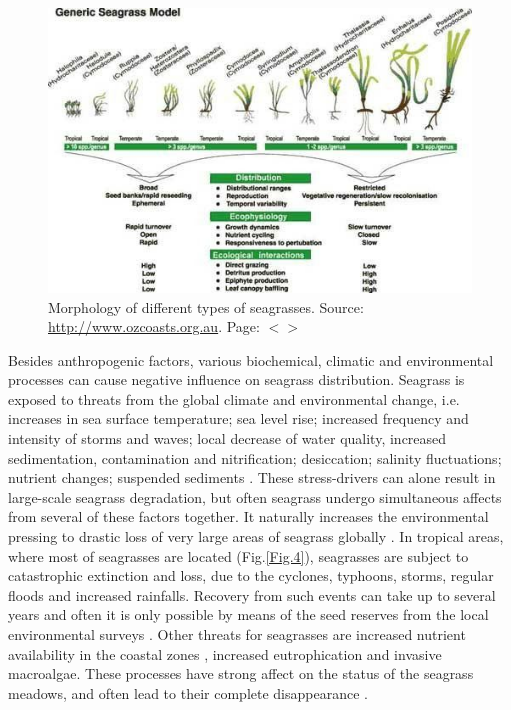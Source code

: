 \documentclass[11pt]{article}
\begin{document}
\begin{figure}
	\centering
	\includegraphics[scale=0.35]{Fig-1-3.jpg}
	\caption{Morphology of different types of seagrasses. Source: \url{http://www.ozcoasts.org.au}. Page: $<$\pageref{page-5}$>$}
	\label{fig:3}
\end{figure}

Besides anthropogenic factors, various biochemical, climatic and environmental processes can cause
negative influence on seagrass distribution. Seagrass is exposed to threats from the global climate and
environmental change, i.e. increases in sea surface temperature\label{page-4}; sea level rise; increased frequency
and intensity of storms and waves; local decrease of water quality, increased sedimentation,
contamination and nitrification; desiccation; salinity fluctuations; nutrient changes; suspended
sediments \cite{Blake00}\label{Blake00}. These stress-drivers can alone result in large-scale seagrass
degradation, but often seagrass undergo simultaneous affects from several of these factors together.
It naturally increases the environmental pressing  to drastic loss of very large areas of
seagrass globally \cite{Orth06}\label{Orth06}.
In tropical areas, where most of seagrasses are located (Fig.\ref{Fig.4}), seagrasses are subject to catastrophic
extinction and loss, due to the cyclones, typhoons, storms, regular floods and increased rainfalls. Recovery from such
events can take up to several years and often it is only possible by means of the seed reserves from the local
environmental surveys \cite{McKenzie07}\label{McKenzie07}. Other threats for seagrasses are 
increased nutrient availability in the coastal zones \cite{Alcoverro1997}\label{Alcoverro1997}, increased
eutrophication and invasive macroalgae. These processes have strong affect on the status of the
seagrass meadows, and often lead to their complete disappearance \cite{Holmer09}\label{Holmer09}.
\end{document}
